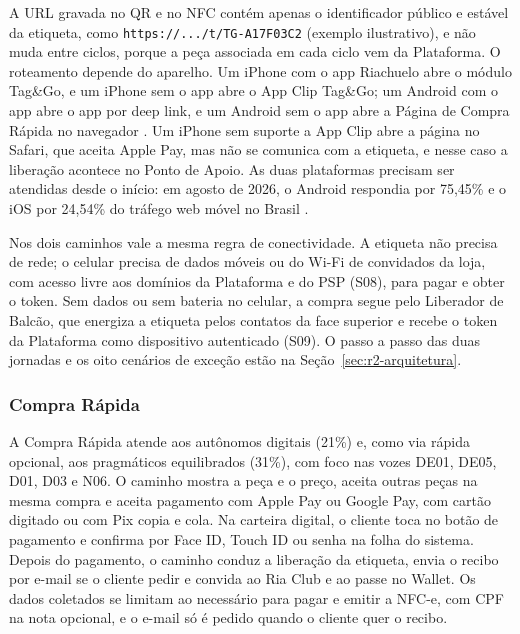 A URL gravada no QR e no NFC contém apenas o identificador público e estável da etiqueta, como \texttt{https://.../t/TG-A17F03C2} (exemplo ilustrativo), e não muda entre ciclos, porque a peça associada em cada ciclo vem da Plataforma. O roteamento depende do aparelho. Um iPhone com o app Riachuelo abre o módulo Tag\&Go, e um iPhone sem o app abre o App Clip Tag\&Go; um Android com o app abre o app por deep link, e um Android sem o app abre a Página de Compra Rápida no navegador \cite{apple2026corenfc,chrome2026webbluetooth}. Um iPhone sem suporte a App Clip abre a página no Safari, que aceita Apple Pay, mas não se comunica com a etiqueta, e nesse caso a liberação acontece no Ponto de Apoio. As duas plataformas precisam ser atendidas desde o início: em agosto de 2026, o Android respondia por 75,45\% e o iOS por 24,54\% do tráfego web móvel no Brasil \cite{statcounter2026so}.

Nos dois caminhos vale a mesma regra de conectividade. A etiqueta não precisa de rede; o celular precisa de dados móveis ou do Wi-Fi de convidados da loja, com acesso livre aos domínios da Plataforma e do PSP (S08), para pagar e obter o token. Sem dados ou sem bateria no celular, a compra segue pelo Liberador de Balcão, que energiza a etiqueta pelos contatos da face superior e recebe o token da Plataforma como dispositivo autenticado (S09). O passo a passo das duas jornadas e os oito cenários de exceção estão na Seção~\ref{sec:r2-arquitetura}.

\subsubsection{Compra Rápida}

A Compra Rápida atende aos autônomos digitais (21\%) e, como via rápida opcional, aos pragmáticos equilibrados (31\%), com foco nas vozes DE01, DE05, D01, D03 e N06. O caminho mostra a peça e o preço, aceita outras peças na mesma compra e aceita pagamento com Apple Pay ou Google Pay, com cartão digitado ou com Pix copia e cola. Na carteira digital, o cliente toca no botão de pagamento e confirma por Face ID, Touch ID ou senha na folha do sistema. Depois do pagamento, o caminho conduz a liberação da etiqueta, envia o recibo por e-mail se o cliente pedir e convida ao Ria Club e ao passe no Wallet. Os dados coletados se limitam ao necessário para pagar e emitir a NFC-e, com CPF na nota opcional, e o e-mail só é pedido quando o cliente quer o recibo.

